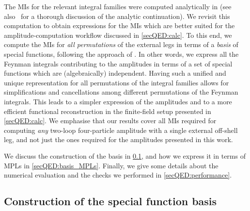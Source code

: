 \documentclass[main.tex]{subfiles}
\begin{document}
The MIs for the relevant integral families were computed analytically in  (see also~ for a thorough discussion of the analytic continuation).
We revisit this computation to obtain expressions for the MIs which are better suited for the amplitude-computation workflow discussed in \cref{secQED:calc}. To this end, we compute the MIs for \emph{all permutations} of the external legs in terms of a \emph{basis} of special functions, following the approach of .
In other words, we express all the Feynman integrals contributing to the amplitudes in terms of a set of special functions which are (algebraically) independent.
Having such a unified and unique representation for all permutations of the integral families allows for simplifications and cancellations among different permutations of the Feynman integrals.
This leads to a simpler expression of the amplitudes and to a more efficient functional reconstruction in the finite-field setup presented in \cref{secQED:calc}. 
We emphasise that our results cover all MIs required for computing \emph{any} two-loop four-particle amplitude with a single external off-shell leg, and not just the ones required for the amplitudes presented in this work.

We discuss the construction of the basis in \cref{secQED:basis_construction}, and how we express it in terms of \acfp{MPL} in \cref{secQED:basis_MPLs}. 
Finally, we give some details about the numerical evaluation and the checks we performed in \cref{secQED:performance}.


\subsection{Construction of the special function basis}
\label{secQED:basis_construction}
\end{document}
